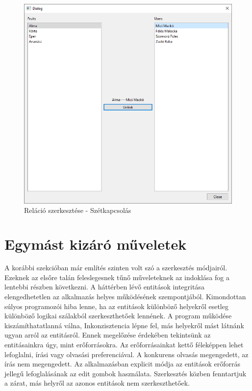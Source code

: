 \begin{figure}[H]
	\centering
	\includegraphics[width=1\textwidth]{images/Unlink.png}
	\caption{Reláció szerkesztése - Szétkapcsolás}
	\label{fig:main_window}
\end{figure}

\section{Egymást kizáró műveletek}

A korábbi szekcióban már említés szinten volt szó a szerkesztés módjairól. Ezeknek az elsőre talán feleslegesnek tűnő műveleteknek az indoklása fog a lentebbi részben következni. A háttérben lévő entitások integritása elengedhetetlen az alkalmazás helyes működésének szempontjából. Kimondottan súlyos programozói hiba lenne, ha az entitások különböző helyekről esetleg különböző logikai szálakból szerkeszthetőek lennének. A program működése kiszámíthatatlanná válna, Inkonzisztencia lépne fel, más helyekről mást látnánk ugyan arról az entitásról. Ennek megelőzése érdekében tekintsünk az entitásainkra úgy, mint erőforrásokra. Az erőforrásainkat kettő féleképpen lehet lefoglalni, írási vagy olvasási preferenciával. A konkurens olvasás megengedett, az írás nem megengedett. Az alkalmazásban explicit módja az entitások erőforrás jellegű lefoglalásának az edit gombok használata. Szerkesztés közben fenntartjuk a zárat, más helyről az azonos entitások nem szerkeszthetőek.

